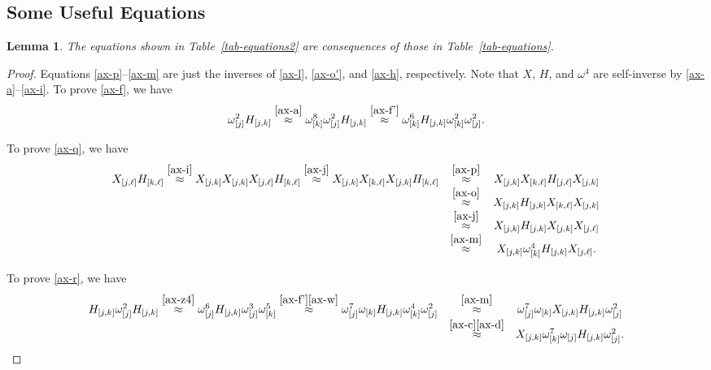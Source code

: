 \documentclass{dalthesis}
\theoremstyle{theorem}
\newtheorem{lemma}[theorem]{Lemma}
\theoremstyle{definition}
\theoremstyle{definition}  %
\theoremstyle{definition}
\newcommand{\jay}{j}
\newcommand{\kay}{k}
\renewcommand{\:}{\mathbin{:}}
\begin{document}
\subsection{Some Useful Equations}
\begin{lemma}\label{lem-derived}
  The equations shown in Table~\ref{tab-equations2} are consequences
  of those in Table~\ref{tab-equations}.
\end{lemma}

\begin{proof}\relax
  Equations \eqref{ax-p}--\eqref{ax-m} are just the inverses of
  \eqref{ax-l}, \eqref{ax-o'}, and \eqref{ax-h}, respectively. Note that
$X$, $H$, and $\omega^4$ are self-inverse by \eqref{ax-a}--\eqref{ax-i}.
  To prove \eqref{ax-f}, we have 
  \[\omega^2_{[\jay]}H_{[\jay,\kay]} 
   \stackrel{\eqref{ax-a}}{\approx}
   \omega^8_{[\kay]}\omega^2_{[\jay]}H_{[\jay,\kay]}
   \stackrel{\eqref{ax-f'}}{\approx}
   \omega^6_{[\kay]}H_{[\jay,\kay]}\omega^2_{[\kay]}\omega^2_{[\jay]}.
  \]
  
  To prove \eqref{ax-q}, we have
  \[\begin{array}{ccc}
    X_{[\jay,\ell]}H_{[\kay,\ell]}
    \stackrel{\eqref{ax-i}}{\approx}
    X_{[\jay,\kay]}X_{[\jay,\kay]}X_{[\jay,\ell]}H_{[\kay,\ell]}
    \stackrel{\eqref{ax-j}}{\approx}
    X_{[\jay,\kay]}X_{[\kay,\ell]}X_{[\jay,\kay]}H_{[\kay,\ell]}
    &\stackrel{\eqref{ax-p}}{\approx}&
    X_{[\jay,\kay]}X_{[\kay,\ell]}H_{[\jay,\ell]}X_{[\jay,\kay]}\\
    &\stackrel{\eqref{ax-o}}{\approx}&
    X_{[\jay,\kay]}H_{[\jay,\kay]}X_{[\kay,\ell]}X_{[\jay,\kay]}\\
    &\stackrel{\eqref{ax-j}}{\approx}&
    X_{[\jay,\kay]}H_{[\jay,\kay]}X_{[\jay,\kay]}X_{[\jay,\ell]}\\
    &\stackrel{\eqref{ax-m}}{\approx}&
    X_{[\jay,\kay]}\omega^4_{[\kay]}H_{[\jay,\kay]}X_{[\jay,\ell]}.\\
  \end{array}
  \]
  
  To prove \eqref{ax-r}, we have \[
\begin{array}{ccc}
 H_{[\jay,\kay]}\omega^2_{[\jay]}H_{[\jay,\kay]}\stackrel{\eqref{ax-z4}}{\approx}\omega^6_{[\jay]}H_{[\jay,\kay]}\omega^3_{[\jay]}\omega^5_{[\kay]}\stackrel{\eqref{ax-f'}\eqref{ax-w}}{\approx}\omega^7_{[\jay]}\omega_{[\kay]}H_{[\jay,\kay]}\omega^4_{[\kay]}\omega^2_{[\jay]}&\stackrel{\eqref{ax-m}}{\approx}&\omega^7_{[\jay]}\omega_{[\kay]}X_{[\jay,\kay]}H_{[\jay,\kay]}\omega^2_{[\jay]}\\
 &\stackrel{\eqref{ax-c}\eqref{ax-d}}{\approx}&X_{[\jay,\kay]} \omega^7_{[\kay]}\omega_{[\jay]}H_{[\jay,\kay]} \omega^2_{[\jay]}.\\
  \end{array}  
\]
  

\end{proof}
\end{document}
